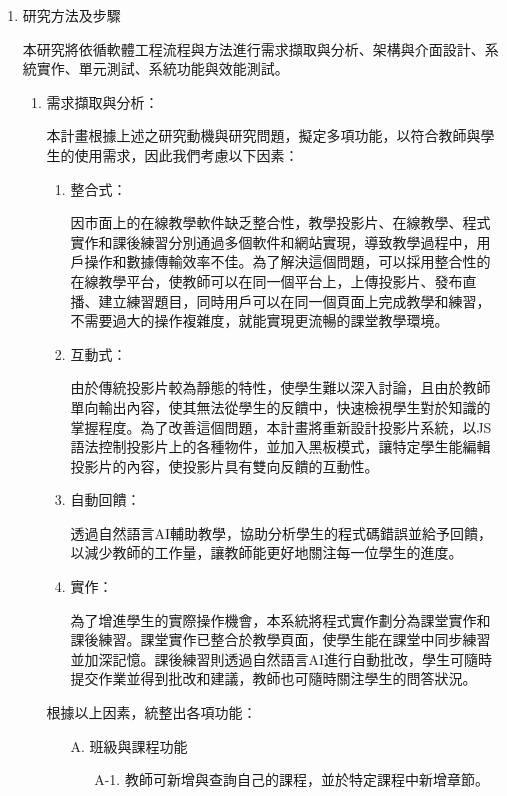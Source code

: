 \documentclass[12pt]{article}
\begin{document}
\begin{enumerate}
  \item 研究方法及步驟
    \par 本研究將依循軟體工程流程與方法進行需求擷取與分析、架構與介面設計、系統實作、單元測試、系統功能與效能測試。
    \begin{enumerate}
      \setlength{\parindent}{2em}
      \item 需求擷取與分析：
        \par 本計畫根據上述之研究動機與研究問題，擬定多項功能，以符合教師與學生的使用需求，因此我們考慮以下因素：
        \begin{enumerate}
          \setlength{\parindent}{2em}
          \item 整合式：
            \par 因市面上的在線教學軟件缺乏整合性，教學投影片、在線教學、程式實作和課後練習分別通過多個軟件和網站實現，導致教學過程中，用戶操作和數據傳輸效率不佳。為了解決這個問題，可以採用整合性的在線教學平台，使教師可以在同一個平台上，上傳投影片、發布直播、建立練習題目，同時用戶可以在同一個頁面上完成教學和練習，不需要過大的操作複雜度，就能實現更流暢的課堂教學環境。
          \item 互動式：
            \par 由於傳統投影片較為靜態的特性，使學生難以深入討論，且由於教師單向輸出內容，使其無法從學生的反饋中，快速檢視學生對於知識的掌握程度。為了改善這個問題，本計畫將重新設計投影片系統，以JS語法控制投影片上的各種物件，並加入黑板模式，讓特定學生能編輯投影片的內容，使投影片具有雙向反饋的互動性。
          \item 自動回饋：
            \par 透過自然語言AI輔助教學，協助分析學生的程式碼錯誤並給予回饋，以減少教師的工作量，讓教師能更好地關注每一位學生的進度。
          \item 實作：
            \par 為了增進學生的實際操作機會，本系統將程式實作劃分為課堂實作和課後練習。課堂實作已整合於教學頁面，使學生能在課堂中同步練習並加深記憶。課後練習則透過自然語言AI進行自動批改，學生可隨時提交作業並得到批改和建議，教師也可隨時關注學生的問答狀況。
        \end{enumerate}
      \par 根據以上因素，統整出各項功能：
        \begin{enumerate}
          \item [A.] 班級與課程功能
            \begin{enumerate}
              \item [A-1.] 教師可新增與查詢自己的課程，並於特定課程中新增章節。

\end{enumerate}
\end{enumerate}
\end{enumerate}
\end{enumerate}
\end{document}
